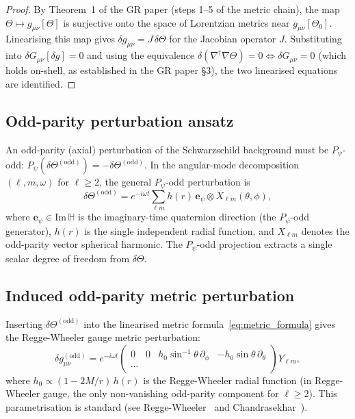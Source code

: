 \documentclass[12pt,a4paper]{article}
\theoremstyle{definition}
\theoremstyle{remark}
\newcommand{\HH}{\mathbb{H}}
\begin{document}
\begin{proof}
By Theorem~1 of the GR paper (steps 1--5 of the metric chain), the map
$\Theta \mapsto g_{\mu\nu}[\Theta]$ is surjective onto the space of Lorentzian
metrics near $g_{\mu\nu}[\Theta_0]$.  Linearising this map gives
$\delta g_{\mu\nu} = J\,\delta\Theta$ for the Jacobian operator $J$.
Substituting into $\delta G_{\mu\nu}[\delta g] = 0$ and using the equivalence
$\delta(\nabla^\dagger\nabla\Theta) = 0 \Leftrightarrow \delta G_{\mu\nu} = 0$
(which holds on-shell, as established in the GR paper §3), the two linearised
equations are identified.
\end{proof}

\subsection{Odd-parity perturbation ansatz}

An odd-parity (axial) perturbation of the Schwarzschild background must be
$P_\psi$-odd: $P_\psi(\delta\Theta^{(\mathrm{odd})}) = -\delta\Theta^{(\mathrm{odd})}$.
In the angular-mode decomposition $(\ell, m, \omega)$ for $\ell \geq 2$, the
general $P_\psi$-odd perturbation is
\begin{equation}
\label{eq:dTheta_odd}
  \delta\Theta^{(\mathrm{odd})}
  = e^{-i\omega t}\sum_{\ell m}
    h(r)\,\boldsymbol{e}_\psi
    \otimes X_{\ell m}(\theta,\phi),
\end{equation}
where $\boldsymbol{e}_\psi \in \mathrm{Im}\,\HH$ is the imaginary-time
quaternion direction (the $P_\psi$-odd generator), $h(r)$ is the single
independent radial function, and $X_{\ell m}$ denotes the odd-parity vector
spherical harmonic.  The $P_\psi$-odd projection extracts a single scalar
degree of freedom from $\delta\Theta$.

\subsection{Induced odd-parity metric perturbation}

Inserting $\delta\Theta^{(\mathrm{odd})}$ into the linearised metric
formula~\eqref{eq:metric_formula} gives the Regge-Wheeler gauge metric
perturbation:
\begin{equation}
\label{eq:delta_g_odd}
  \delta g_{\mu\nu}^{(\mathrm{odd})}
  = e^{-i\omega t}\begin{pmatrix} 0 & 0 & h_0\sin^{-1}\!\theta\,\partial_\phi
    & -h_0\sin\theta\,\partial_\theta \\ \cdots \end{pmatrix}
  Y_{\ell m},
\end{equation}
where $h_0 \propto (1-2M/r)\,h(r)$ is the Regge-Wheeler radial function
(in Regge-Wheeler gauge, the only non-vanishing odd-parity component for
$\ell \geq 2$).  This parametrisation is standard (see
Regge-Wheeler~\cite{regge_wheeler1957} and Chandrasekhar~\cite{chandrasekhar1983}).
\end{document}
